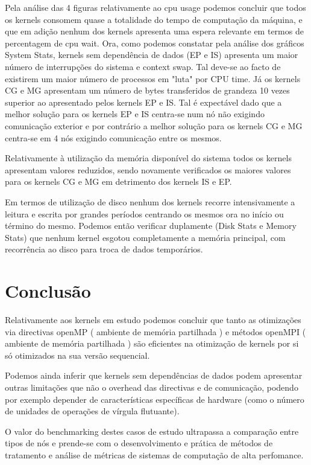 \documentclass[conference,compsoc]{IEEEtran}
\begin{document}
Pela análise das 4 figuras relativamente ao cpu usage podemos concluir que todos os kernels consomem quase a totalidade do tempo de computação da máquina, e que em adição nenhum dos kernels apresenta uma espera relevante em termos de percentagem de cpu wait. Ora, como podemos constatar pela análise dos gráficos System Stats, kernels sem dependência de dados (EP e IS) apresenta um maior número de interrupções do sistema e context swap. Tal deve-se ao facto de existirem um maior número de processos em "luta" por CPU time. Já os kernels CG e MG apresentam um número de bytes transferidos de grandeza 10 vezes superior ao apresentado pelos kernels EP e IS. Tal é expectável dado que a  melhor solução para os kernels EP e IS centra-se num nó não exigindo comunicação exterior e por contrário a melhor solução para os kernels CG e MG centra-se em 4 nós exigindo comunicação entre os mesmos.\par 
Relativamente à utilização da memória disponível do sistema todos os kernels apresentam valores reduzidos, sendo novamente verificados os maiores valores para os kernels CG e MG em detrimento dos kernels IS e EP. \par 
Em termos de utilização de disco nenhum dos kernels recorre intensivamente a leitura e escrita por grandes períodos centrando os mesmos ora no início ou término do mesmo. Podemos então verificar duplamente (Disk Stats e Memory Stats) que nenhum kernel esgotou completamente a memória principal, com recorrência ao disco para troca de dados temporários.



\section{Conclusão}
Relativamente aos kernels em estudo podemos concluir que tanto as otimizações via directivas openMP ( ambiente de memória partilhada ) e métodos openMPI ( ambiente de memória partilhada ) são eficientes na otimização de kernels por si só otimizados na sua versão sequencial.\par Podemos ainda inferir que kernels sem dependências de dados podem apresentar outras limitações que não o overhead das directivas e de comunicação, podendo por exemplo depender de características específicas de hardware (como o número de unidades de operações de vírgula flutuante). \par 
O valor do benchmarking destes casos de estudo ultrapassa a comparação entre tipos de nós e prende-se com o desenvolvimento e prática de métodos de tratamento e análise de métricas de sistemas de computação de alta perfomance. 
\end{document}
